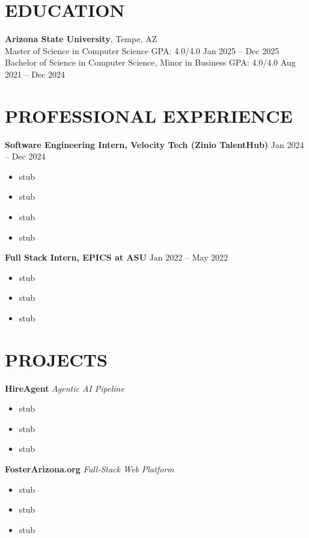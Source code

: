 \documentclass[letterpaper,10pt]{article}
\begin{document}
{\fontsize{10}{13}\selectfont

\section*{EDUCATION}
{\fontsize{10}{13}\selectfont
\textbf{Arizona State University}, Tempe, AZ \\
Master of Science in Computer Science \hfill GPA: 4.0/4.0 \quad Jan 2025 -- Dec 2025 \\
Bachelor of Science in Computer Science, Minor in Business \hfill GPA: 4.0/4.0 \quad Aug 2021 -- Dec 2024}

\section*{PROFESSIONAL EXPERIENCE}

{\fontsize{10}{13}\selectfont
\textbf{Software Engineering Intern, Velocity Tech (Zinio TalentHub)} \hfill Jan 2024 -- Dec 2024
\begin{itemize}
  \item stub
  \item stub
  \item stub
  \item stub
\end{itemize}

\vspace{2pt}
\textbf{Full Stack Intern, EPICS at ASU} \hfill Jan 2022 -- May 2022
\begin{itemize}
  \item stub
  \item stub
  \item stub
\end{itemize}
}

\section*{PROJECTS}

{\fontsize{10}{13}\selectfont
\textbf{HireAgent} \hfill \textit{Agentic AI Pipeline}
\begin{itemize}
  \item stub
  \item stub
  \item stub
\end{itemize}

\vspace{2pt}
\textbf{FosterArizona.org} \hfill \textit{Full-Stack Web Platform}
\begin{itemize}
  \item stub
  \item stub
  \item stub
\end{itemize}

}}
\end{document}

